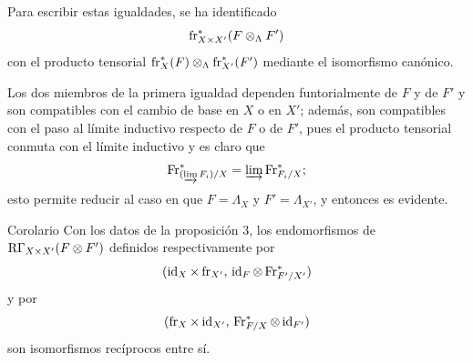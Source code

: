 Para escribir estas igualdades, se ha identificado
\[
\operatorname{fr}_{X\times X'}^*(F\otimes_\Lambda F')
\]
con el producto tensorial $\operatorname{fr}_X^*(F)\otimes_\Lambda\operatorname{fr}_{X'}^*(F')$ mediante el isomorfismo canónico.

Los dos miembros de la primera igualdad dependen funtorialmente de $F$ y de $F'$ y son compatibles con el cambio de base en $X$ o en $X'$; además, son compatibles con el paso al límite inductivo respecto de $F$ o de $F'$, pues el producto tensorial conmuta con el límite inductivo y es claro que
\[
\operatorname{Fr}^*_{(\varinjlim F_i)/X}=\varinjlim\operatorname{Fr}^*_{F_i/X};
\]
esto permite reducir al caso en que $F=\Lambda_X$ y $F'=\Lambda_{X'}$, y entonces es evidente.

\begin{statement}{Corolario}
Con los datos de la proposición 3, los endomorfismos de $\mathrm{R}\Gamma_{X\times X'}(F\otimes F')$ definidos respectivamente por
\[
(\operatorname{id}_X\times\operatorname{fr}_{X'},\,\operatorname{id}_F\otimes\operatorname{Fr}^*_{F'/X'})
\]
y por
\[
(\operatorname{fr}_X\times\operatorname{id}_{X'},\,\operatorname{Fr}^*_{F/X}\otimes\operatorname{id}_{F'})
\]
son isomorfismos recíprocos entre sí.
\end{statement}
